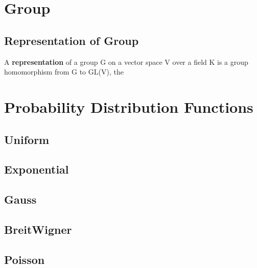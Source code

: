 \section{Group}

\subsection{Representation of Group}
A \textbf{representation} of a group G on a vector space V over a field K is
a group homomorphism from G to GL(V), the 

\section{Probability Distribution Functions}

\subsection{Uniform}

\subsection{Exponential}

\subsection{Gauss}

\subsection{BreitWigner}

\subsection{Poisson}

